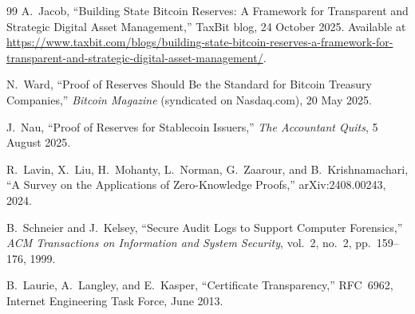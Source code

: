 \documentclass[11pt]{article}
\begin{document}
\begin{thebibliography}{99}
  A.~Jacob,
  ``Building State Bitcoin Reserves: A Framework for Transparent
  and Strategic Digital Asset Management,''
  TaxBit blog, 24 October 2025.
  Available at
  \url{https://www.taxbit.com/blogs/building-state-bitcoin-reserves-a-framework-for-transparent-and-strategic-digital-asset-management/}.
  
  N.~Ward,
  ``Proof of Reserves Should Be the Standard for Bitcoin Treasury Companies,''
  \emph{Bitcoin Magazine} (syndicated on Nasdaq.com), 20 May 2025.
  
  J.~Nau,
  ``Proof of Reserves for Stablecoin Issuers,''
  \emph{The Accountant Quits}, 5 August 2025.
  
  R.~Lavin, X.~Liu, H.~Mohanty, L.~Norman, G.~Zaarour, and B.~Krishnamachari,
  ``A Survey on the Applications of Zero-Knowledge Proofs,''
  arXiv:2408.00243, 2024.
  
  B.~Schneier and J.~Kelsey,
  ``Secure Audit Logs to Support Computer Forensics,''
  \emph{ACM Transactions on Information and System Security},
  vol.~2, no.~2, pp.~159--176, 1999.
  
  B.~Laurie, A.~Langley, and E.~Kasper,
  ``Certificate Transparency,''
  RFC~6962, Internet Engineering Task Force, June 2013.
  
  \end{thebibliography}  
\end{document}
